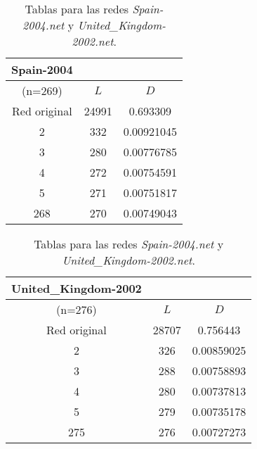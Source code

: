 \begin{table}[H]
\begin{minipage}{0.45\textwidth}
  \begin{tabular}{ccc}
    Spain-2004 & & \\
    \hline
    (n=269)              &   $L$ &   $D$ \\
    \hline
    Red original &               24991 & 0.693309   \\
    2            &                 332 & 0.00921045 \\
    3            &                 280 & 0.00776785 \\
    4            &                 272 & 0.00754591 \\
    5            &                 271 & 0.00751817 \\
    268          &                 270 & 0.00749043 \\
    \hline
  \end{tabular}
\end{minipage}
\begin{minipage}{0.45\textwidth}
  \begin{tabular}{ccc}
    United\_Kingdom-2002 & & \\
    \hline
    (n=276)              &   $L$ &   $D$ \\
    \hline
    Red original &               28707 & 0.756443   \\
    2            &                 326 & 0.00859025 \\
    3            &                 288 & 0.00758893 \\
    4            &                 280 & 0.00737813 \\
    5            &                 279 & 0.00735178 \\
    275          &                 276 & 0.00727273 \\
    \hline
  \end{tabular}
\end{minipage}
\label{sp04-uk02}
\caption{Tablas para las redes \textit{Spain-2004.net} y \textit{United\_Kingdom-2002.net}.}
\end{table}
